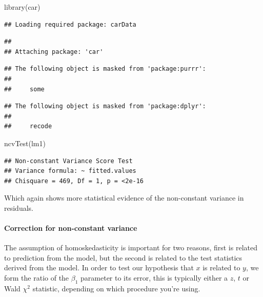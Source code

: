\documentclass[
]{article}
\newenvironment{Shaded}{\begin{snugshade}}{\end{snugshade}}
\newcommand{\FunctionTok}[1]{\textcolor[rgb]{0.00,0.00,0.00}{#1}}
\newcommand{\NormalTok}[1]{#1}
\begin{document}
\begin{Shaded}
\begin{Highlighting}[]
\FunctionTok{library}\NormalTok{(car)}
\end{Highlighting}
\end{Shaded}

\begin{verbatim}
## Loading required package: carData
\end{verbatim}

\begin{verbatim}
## 
## Attaching package: 'car'
\end{verbatim}

\begin{verbatim}
## The following object is masked from 'package:purrr':
## 
##     some
\end{verbatim}

\begin{verbatim}
## The following object is masked from 'package:dplyr':
## 
##     recode
\end{verbatim}

\begin{Shaded}
\begin{Highlighting}[]
\FunctionTok{ncvTest}\NormalTok{(lm1)}
\end{Highlighting}
\end{Shaded}

\begin{verbatim}
## Non-constant Variance Score Test 
## Variance formula: ~ fitted.values 
## Chisquare = 469, Df = 1, p = <2e-16
\end{verbatim}

Which again shows more statistical evidence of the non-constant variance in residuals.

\hypertarget{correction-for-non-constant-variance}{%
\paragraph{Correction for non-constant variance}\label{correction-for-non-constant-variance}}

The assumption of homoskedasticity is important for two reasons, first is related to prediction from the model, but the second is related to the test statistics derived from the model. In order to test our hypothesis that \(x\) is related to \(y\), we form the ratio of the \(\beta_1\) parameter to its error, this is typically either a \(z\), \(t\) or Wald \(\chi^2\) statistic, depending on which procedure you're using.
\end{document}
